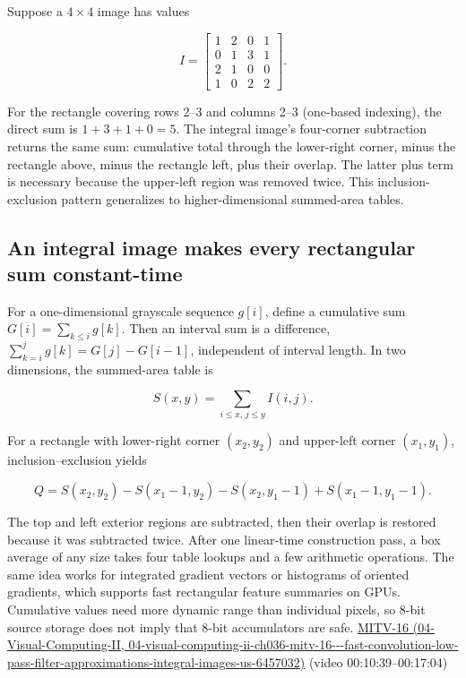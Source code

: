 Suppose a \(4\times4\) image has values

\[
I=\begin{bmatrix}1&2&0&1\\0&1&3&1\\2&1&0&0\\1&0&2&2\end{bmatrix}.
\]

For the rectangle covering rows 2--3 and columns 2--3 (one-based indexing), the direct sum is \(1+3+1+0=5\). The integral image's four-corner subtraction returns the same sum: cumulative total through the lower-right corner, minus the rectangle above, minus the rectangle left, plus their overlap. The latter plus term is necessary because the upper-left region was removed twice. This inclusion-exclusion pattern generalizes to higher-dimensional summed-area tables.

\subsection{An integral image makes every rectangular sum constant-time}\label{03-visual-computing-i-ch004-an-integral-image-makes-every-rectangular-sum-constant-time}

For a one-dimensional grayscale sequence \(g[i]\), define a cumulative sum \(G[i]=\sum_{k\le i}g[k]\). Then an interval sum is a difference, \(\sum_{k=i}^{j}g[k]=G[j]-G[i-1]\), independent of interval length. In two dimensions, the summed-area table is

\[
S(x,y)=\sum_{i\le x,\,j\le y}I(i,j).
\]

For a rectangle with lower-right corner \((x_2,y_2)\) and upper-left corner \((x_1,y_1)\), inclusion--exclusion yields

\[
Q=S(x_2,y_2)-S(x_1-1,y_2)-S(x_2,y_1-1)+S(x_1-1,y_1-1).
\]

The top and left exterior regions are subtracted, then their overlap is restored because it was subtracted twice. After one linear-time construction pass, a box average of any size takes four table lookups and a few arithmetic operations. The same idea works for integrated gradient vectors or histograms of oriented gradients, which supports fast rectangular feature summaries on GPUs. Cumulative values need more dynamic range than individual pixels, so 8-bit source storage does not imply that 8-bit accumulators are safe. \href{../04-Visual-Computing-II/main.pdf\#nameddest=04-visual-computing-ii-ch036-mitv-16---fast-convolution-low-pass-filter-approximations-integral-images-us-6457032}{MITV-16 (04-Visual-Computing-II, 04-visual-computing-ii-ch036-mitv-16-\/-\/-fast-convolution-low-pass-filter-approximations-integral-images-us-6457032)} (video 00:10:39--00:17:04)

